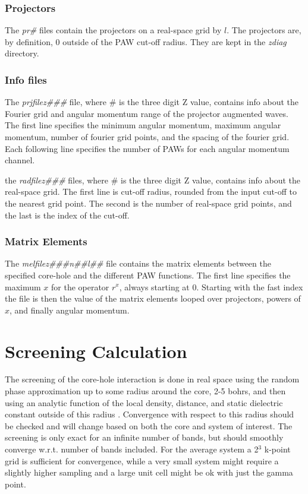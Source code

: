 \documentclass[11pt]{report}
\begin{document}
\subsection{Projectors}
The \emph{pr\#} files contain the projectors on a real-space grid by $l$. The projectors are, by definition, 0 outside of the PAW cut-off radius. They are kept in the \emph{zdiag} directory.

\subsection{Info files}
The \emph{prjfilez\#\#\#} file, where \# is the three digit Z value, contains info about the Fourier grid and angular momentum range of the projector augmented waves. The first line specifies the minimum angular momentum, maximum angular momentum, number of fourier grid points, and the spacing of the fourier grid. Each following line specifies the number of PAWs for each angular momentum channel. 

the \emph{radfilez\#\#\#} files, where \# is the three digit Z value, contains info about the real-space grid. The first line is cut-off radius, rounded from the input cut-off to the nearest grid point. The second is the number of real-space grid points, and the last is the index of the cut-off.

\subsection{Matrix Elements}

The \emph{melfilez\#\#\#n\#\#l\#\#} file contains the matrix elements between the specified core-hole and the different PAW functions. The first line specifies the maximum $x$ for the operator $r^x$, always starting at 0. Starting with the fast index the file is then the value of the matrix elements looped over projectors, powers of $x$, and finally angular momentum.

\chapter{Screening Calculation}
\label{screening}

The screening of the core-hole interaction is done in real space using the random phase approximation up to 
some radius around the core, 2-5 bohrs, and then using an analytic function of the local density, distance, 
and static dielectric constant outside of this radius \cite{screening}. Convergence with respect to this radius should be 
checked and will change based on both the core and system of interest. The screening is only exact for an 
infinite number of bands, but should smoothly converge w.r.t. number of bands included. For the average 
system a 2$^3$ k-point grid is sufficient for convergence, while a very small system might require a 
slightly higher sampling and a large unit cell might be ok with just the gamma point.
\end{document}
